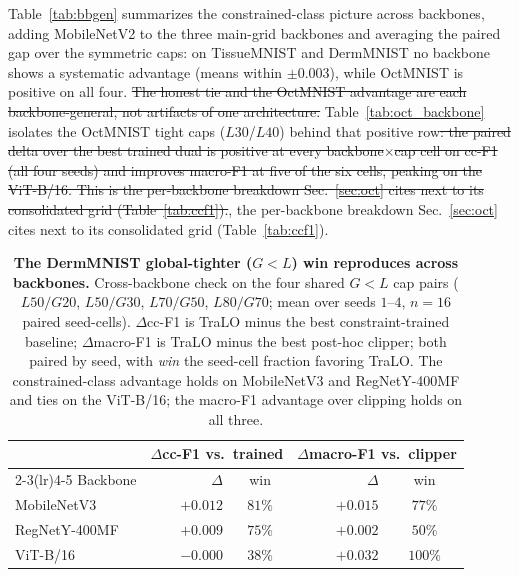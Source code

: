 \documentclass[10pt]{article}
\newcommand{\del}[1]{{\color{red}\sout{#1}}}
\begin{document}
Table~\ref{tab:bbgen} summarizes the constrained-class picture across
backbones, adding MobileNetV2 to the three main-grid backbones and
averaging the paired gap over the symmetric caps: on TissueMNIST and
DermMNIST no backbone shows a systematic advantage (means within
$\pm0.003$), while OctMNIST is positive on all four. \del{The honest tie
and the OctMNIST advantage are each backbone-general, not artifacts of
one architecture. }Table~\ref{tab:oct_backbone} isolates the OctMNIST
tight caps ($L30$/$L40$) behind that positive row\del{: the paired delta
over the best trained dual is positive at every backbone$\times$cap
cell on cc-F1 (all four seeds) and improves macro-F1 at five of the
six cells, peaking on the ViT-B/16. This is the per-backbone breakdown
Sec.~\ref{sec:oct} cites next to its consolidated grid
(Table~\ref{tab:ccf1}).}{\color{blue}, the per-backbone breakdown
Sec.~\ref{sec:oct} cites next to its consolidated grid
(Table~\ref{tab:ccf1}).}







{\color{blue}}

\begin{table}[t]\centering\small
\setlength{\tabcolsep}{5pt}
\caption{\textbf{The DermMNIST global-tighter ($G{<}L$) win reproduces
across backbones.} Cross-backbone check on the four shared $G{<}L$
cap pairs ($L50/G20$, $L50/G30$, $L70/G50$, $L80/G70$; mean over
seeds $1$--$4$, $n{=}16$ paired seed-cells). $\Delta$cc-F1 is TraLO
minus the best constraint-trained baseline; $\Delta$macro-F1 is TraLO
minus the best post-hoc clipper; both paired by seed, with \emph{win}
the seed-cell fraction favoring TraLO. The constrained-class advantage
holds on MobileNetV3 and RegNet{\color{blue}Y-400MF} and ties on the ViT{\color{blue}-B/16}; the macro-F1
advantage over clipping holds on all three.}
\label{tab:asym_xbackbone}
\setlength{\tabcolsep}{4pt}\small
\begin{tabular}{l rc rc}
\toprule
 & \multicolumn{2}{c}{$\Delta$cc-F1 vs.\ trained} & \multicolumn{2}{c}{$\Delta$macro-F1 vs.\ clipper} \\
\cmidrule(lr){2-3}\cmidrule(lr){4-5}
Backbone & $\Delta$ & win & $\Delta$ & win \\
\midrule
MobileNetV3    & $+0.012$ & $81\%$  & $+0.015$ & $77\%$ \\
RegNetY-400MF  & $+0.009$ & $75\%$  & $+0.002$ & $50\%$ \\
ViT-B/16       & $-0.000$ & $38\%$  & $+0.032$ & $100\%$ \\
\bottomrule
\end{tabular}
\end{table}
\end{document}
